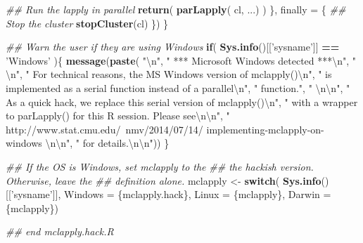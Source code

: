 \documentclass[
  12pt,
  french,
  a4paper,
  extrafontsizes,onecolumn,openright
  ]{memoir}
\newenvironment{Shaded}{\begin{snugshade}}{\end{snugshade}}
\newcommand{\CharTok}[1]{\textcolor[rgb]{0.31,0.60,0.02}{#1}}
\newcommand{\CommentTok}[1]{\textcolor[rgb]{0.56,0.35,0.01}{\textit{#1}}}
\newcommand{\ControlFlowTok}[1]{\textcolor[rgb]{0.13,0.29,0.53}{\textbf{#1}}}
\newcommand{\DataTypeTok}[1]{\textcolor[rgb]{0.13,0.29,0.53}{#1}}
\newcommand{\KeywordTok}[1]{\textcolor[rgb]{0.13,0.29,0.53}{\textbf{#1}}}
\newcommand{\NormalTok}[1]{#1}
\newcommand{\OperatorTok}[1]{\textcolor[rgb]{0.81,0.36,0.00}{\textbf{#1}}}
\newcommand{\StringTok}[1]{\textcolor[rgb]{0.31,0.60,0.02}{#1}}
\begin{document}
\begin{Shaded}
\begin{Highlighting}[]
    \CommentTok{## Run the lapply in parallel }
    \KeywordTok{return}\NormalTok{( }\KeywordTok{parLapply}\NormalTok{( cl, ...) )}
\NormalTok{  \}, }\DataTypeTok{finally =}\NormalTok{ \{        }
    \CommentTok{## Stop the cluster}
    \KeywordTok{stopCluster}\NormalTok{(cl)}
\NormalTok{  \})}
\NormalTok{\}}

\CommentTok{## Warn the user if they are using Windows}
\ControlFlowTok{if}\NormalTok{( }\KeywordTok{Sys.info}\NormalTok{()[[}\StringTok{'sysname'}\NormalTok{]] }\OperatorTok{==}\StringTok{ 'Windows'}\NormalTok{ )\{}
  \KeywordTok{message}\NormalTok{(}\KeywordTok{paste}\NormalTok{(}
    \StringTok{"}\CharTok{\textbackslash{}n}\StringTok{"}\NormalTok{, }
    \StringTok{"   *** Microsoft Windows detected ***}\CharTok{\textbackslash{}n}\StringTok{"}\NormalTok{,}
    \StringTok{"   }\CharTok{\textbackslash{}n}\StringTok{"}\NormalTok{,}
    \StringTok{"   For technical reasons, the MS Windows version of mclapply()}\CharTok{\textbackslash{}n}\StringTok{"}\NormalTok{,}
    \StringTok{"   is implemented as a serial function instead of a parallel}\CharTok{\textbackslash{}n}\StringTok{"}\NormalTok{,}
    \StringTok{"   function."}\NormalTok{,}
    \StringTok{"   }\CharTok{\textbackslash{}n\textbackslash{}n}\StringTok{"}\NormalTok{,}
    \StringTok{"   As a quick hack, we replace this serial version of mclapply()}\CharTok{\textbackslash{}n}\StringTok{"}\NormalTok{,}
    \StringTok{"   with a wrapper to parLapply() for this R session. Please see}\CharTok{\textbackslash{}n\textbackslash{}n}\StringTok{"}\NormalTok{,}
    \StringTok{"     http://www.stat.cmu.edu/~nmv/2014/07/14/}
\StringTok{    implementing-mclapply-on-windows }\CharTok{\textbackslash{}n\textbackslash{}n}\StringTok{"}\NormalTok{,}
    \StringTok{"   for details.}\CharTok{\textbackslash{}n\textbackslash{}n}\StringTok{"}\NormalTok{))}
\NormalTok{\}}

\CommentTok{## If the OS is Windows, set mclapply to the}
\CommentTok{## the hackish version. Otherwise, leave the}
\CommentTok{## definition alone. }
\NormalTok{mclapply <-}\StringTok{ }\ControlFlowTok{switch}\NormalTok{( }\KeywordTok{Sys.info}\NormalTok{()[[}\StringTok{'sysname'}\NormalTok{]],}
                    \DataTypeTok{Windows =}\NormalTok{ \{mclapply.hack\}, }
                    \DataTypeTok{Linux   =}\NormalTok{ \{mclapply\},}
                    \DataTypeTok{Darwin  =}\NormalTok{ \{mclapply\})}

\CommentTok{## end mclapply.hack.R}
\end{Highlighting}
\end{Shaded}
\end{document}
